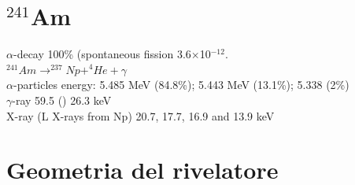 \documentclass[a4paper, 11 pt]{report}
\begin{document}





\clearpage

\appendix
\section{$^{241}$Am}
$\alpha$-decay 100\%    (spontaneous fission 3.6$\times$10$^{-12}$.\\
$ ^{241}Am\rightarrow^{237}Np+^4He+\gamma$\\
$\alpha$-particles energy: 5.485 MeV (84.8\%); 5.443 MeV (13.1\%); 5.338 (2\%)\\
$\gamma$-ray 59.5 () 26.3 keV\\
X-ray (L  X-rays  from  Np) 20.7,  17.7,  16.9  and  13.9  keV\\

\section{Geometria del rivelatore}
\end{document}
